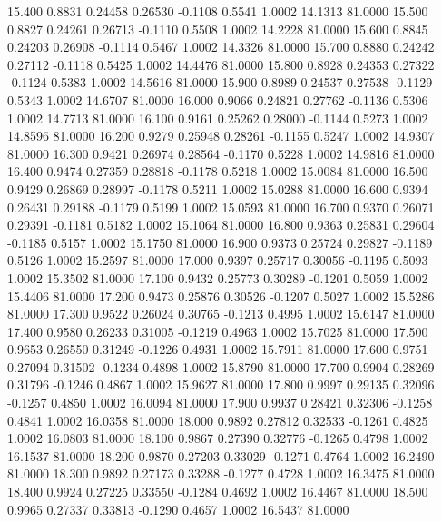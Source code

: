   15.400   0.8831   0.24458   0.26530  -0.1108   0.5541   1.0002  14.1313  81.0000
  15.500   0.8827   0.24261   0.26713  -0.1110   0.5508   1.0002  14.2228  81.0000
  15.600   0.8845   0.24203   0.26908  -0.1114   0.5467   1.0002  14.3326  81.0000
  15.700   0.8880   0.24242   0.27112  -0.1118   0.5425   1.0002  14.4476  81.0000
  15.800   0.8928   0.24353   0.27322  -0.1124   0.5383   1.0002  14.5616  81.0000
  15.900   0.8989   0.24537   0.27538  -0.1129   0.5343   1.0002  14.6707  81.0000
  16.000   0.9066   0.24821   0.27762  -0.1136   0.5306   1.0002  14.7713  81.0000
  16.100   0.9161   0.25262   0.28000  -0.1144   0.5273   1.0002  14.8596  81.0000
  16.200   0.9279   0.25948   0.28261  -0.1155   0.5247   1.0002  14.9307  81.0000
  16.300   0.9421   0.26974   0.28564  -0.1170   0.5228   1.0002  14.9816  81.0000
  16.400   0.9474   0.27359   0.28818  -0.1178   0.5218   1.0002  15.0084  81.0000
  16.500   0.9429   0.26869   0.28997  -0.1178   0.5211   1.0002  15.0288  81.0000
  16.600   0.9394   0.26431   0.29188  -0.1179   0.5199   1.0002  15.0593  81.0000
  16.700   0.9370   0.26071   0.29391  -0.1181   0.5182   1.0002  15.1064  81.0000
  16.800   0.9363   0.25831   0.29604  -0.1185   0.5157   1.0002  15.1750  81.0000
  16.900   0.9373   0.25724   0.29827  -0.1189   0.5126   1.0002  15.2597  81.0000
  17.000   0.9397   0.25717   0.30056  -0.1195   0.5093   1.0002  15.3502  81.0000
  17.100   0.9432   0.25773   0.30289  -0.1201   0.5059   1.0002  15.4406  81.0000
  17.200   0.9473   0.25876   0.30526  -0.1207   0.5027   1.0002  15.5286  81.0000
  17.300   0.9522   0.26024   0.30765  -0.1213   0.4995   1.0002  15.6147  81.0000
  17.400   0.9580   0.26233   0.31005  -0.1219   0.4963   1.0002  15.7025  81.0000
  17.500   0.9653   0.26550   0.31249  -0.1226   0.4931   1.0002  15.7911  81.0000
  17.600   0.9751   0.27094   0.31502  -0.1234   0.4898   1.0002  15.8790  81.0000
  17.700   0.9904   0.28269   0.31796  -0.1246   0.4867   1.0002  15.9627  81.0000
  17.800   0.9997   0.29135   0.32096  -0.1257   0.4850   1.0002  16.0094  81.0000
  17.900   0.9937   0.28421   0.32306  -0.1258   0.4841   1.0002  16.0358  81.0000
  18.000   0.9892   0.27812   0.32533  -0.1261   0.4825   1.0002  16.0803  81.0000
  18.100   0.9867   0.27390   0.32776  -0.1265   0.4798   1.0002  16.1537  81.0000
  18.200   0.9870   0.27203   0.33029  -0.1271   0.4764   1.0002  16.2490  81.0000
  18.300   0.9892   0.27173   0.33288  -0.1277   0.4728   1.0002  16.3475  81.0000
  18.400   0.9924   0.27225   0.33550  -0.1284   0.4692   1.0002  16.4467  81.0000
  18.500   0.9965   0.27337   0.33813  -0.1290   0.4657   1.0002  16.5437  81.0000
